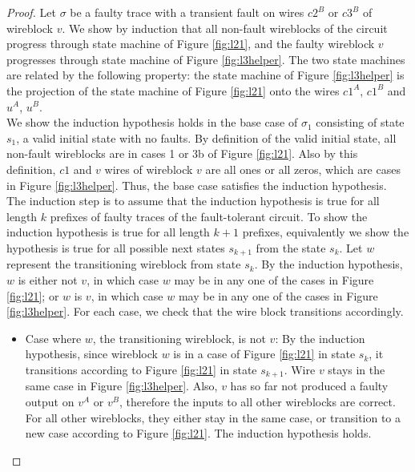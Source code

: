 \documentclass[12pt]{report}
\begin{document}
\begin{proof}
Let $\sigma$ be a faulty trace with a transient fault on wires $c2^B$ or $c3^B$ of wireblock $v$.  We show by induction that all non-fault wireblocks of the circuit progress through state machine of Figure \ref{fig:l21}, and the faulty wireblock $v$ progresses through state machine of Figure \ref{fig:l3helper}.  The two state machines are related by the following property:  the state machine of Figure \ref{fig:l3helper} is the projection of the state machine of Figure \ref{fig:l21} onto the wires $c1^A$, $c1^B$ and $u^A$, $u^B$.\\

We show the induction hypothesis holds in the base case of $\sigma_1$ consisting of state $s_1$, a valid initial state with no faults.  By definition of the valid initial state, all non-fault wireblocks are in cases 1 or 3b of Figure \ref{fig:l21}.  Also by this definition, $c1$ and $v$ wires of wireblock $v$ are all ones or all zeros, which are cases in Figure \ref{fig:l3helper}.  Thus, the base case satisfies the induction hypothesis.\\

The induction step is to assume that the induction hypothesis is true for all length $k$ prefixes of faulty traces of the fault-tolerant circuit.  To show the induction hypothesis is true for all length $k+1$ prefixes, equivalently we show the hypothesis is true for all possible next states $s_{k+1}$ from the state $s_k$. Let $w$ represent the transitioning wireblock from state $s_k$. By the induction hypothesis, $w$ is either not $v$, in which case $w$ may be in any one of the cases in Figure 
 \ref{fig:l21}; or $w$ is $v$, in which case $w$ may be in any one of the cases in Figure \ref{fig:l3helper}.  For each case, we check that the wire block transitions accordingly. 
 
\begin{itemize}
\item Case where $w$, the transitioning wireblock, is not $v$:  By the induction hypothesis, since wireblock $w$ is in a case of Figure \ref{fig:l21} in state $s_k$, it transitions according to Figure \ref{fig:l21} in state $s_{k+1}$.  Wire $v$ stays in the same case in Figure \ref{fig:l3helper}.  Also, $v$ has so far not produced a faulty output on $v^A$ or $v^B$, therefore the inputs to all other wireblocks are correct.  For all other wireblocks, they either stay in the same case, or transition to a new case according to Figure \ref{fig:l21}.  The induction hypothesis holds.


\end{itemize}
\end{proof}
\end{document}
